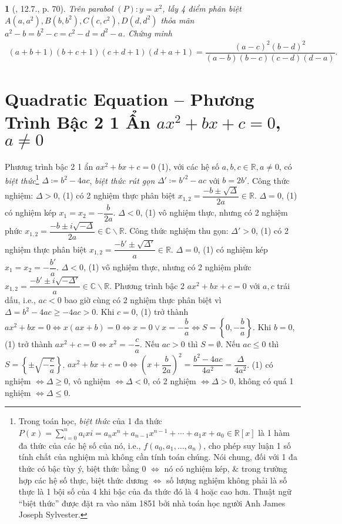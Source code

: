 \documentclass{article}
\newtheorem{baitoan}{}
\begin{document}
\begin{baitoan}[\cite{TLCT_THCS_Toan_9_dai_so}, 12.7., p. 70]
	Trên parabol $(P): y = x^2$, lấy 4 điểm phân biệt $A(a,a^2),B(b,b^2),C(c,c^2),D(d,d^2)$ thỏa mãn $a^2 - b = b^2 - c = c^2 - d = d^2 - a$. Chứng minh
	\begin{align*}
		(a + b + 1)(b + c + 1)(c + d + 1)(d + a + 1) = \dfrac{(a - c)^2(b - d)^2}{(a - b)(b - c)(c - d)(d - a)}.
	\end{align*}
\end{baitoan}


\section{Quadratic Equation -- Phương Trình Bậc 2 1 Ẩn $ax^2 + bx + c = 0$, $a\ne0$}
 Phương trình bậc 2 1 ẩn $ax^2 + bx + c = 0$ (1), với các hệ số $a,b,c\in\mathbb{R},a\ne0$, có \textit{biệt thức}\footnote{Trong toán học, \textit{biệt thức} của 1 đa thức $P(x) = \sum_{i=0}^n a_ixi = a_nx^n + a_{n-1}x^{n-1} + \cdots + a_1x + a_0\in\mathbb{R}[x]$ là 1 hàm đa thức của các hệ số của nó, i.e., $f(a_0,a_1,\ldots,a_n)$, cho phép suy luận 1 số tính chất của nghiệm mà không cần tính toán chúng. Nói chung, đối với 1 đa thức có bậc tùy ý, biệt thức bằng 0 $\Leftrightarrow$ nó có nghiệm kép, \& trong trường hợp các hệ số thực, biệt thức dương $\Leftrightarrow$ số lượng nghiệm không phải là số thực là 1 bội số của 4 khi bậc của đa thức đó là 4 hoặc cao hơn. Thuật ngữ ``biệt thức'' được đặt ra vào năm 1851 bởi nhà toán học người Anh James Joseph Sylvester.} $\Delta\coloneqq b^2 - 4ac$, \textit{biệt thức rút gọn} $\Delta'\coloneqq b'^2 - ac$ với $b = 2b'$.  Công thức nghiệm: $\Delta > 0$, (1) có 2 nghiệm thực phân biệt $x_{1,2} = \dfrac{-b\pm\sqrt{\Delta}}{2a}\in\mathbb{R}$. $\Delta = 0$, (1) có nghiệm kép $x_1 = x_2 = -\dfrac{b}{2a}$. $\Delta < 0$, (1) vô nghiệm thực, nhưng có 2 nghiệm phức $x_{1,2} = \dfrac{-b\pm i\sqrt{-\Delta}}{2a}\in\mathbb{C}\backslash\mathbb{R}$.  Công thức nghiệm thu gọn: $\Delta' > 0$, (1) có 2 nghiệm thực phân biệt $x_{1,2} = \dfrac{-b'\pm\sqrt{\Delta'}}{a}\in\mathbb{R}$. $\Delta = 0$, (1) có nghiệm kép $x_1 = x_2 = -\dfrac{b'}{a}$. $\Delta < 0$, (1) vô nghiệm thực, nhưng có 2 nghiệm phức $x_{1,2} = \dfrac{-b'\pm i\sqrt{-\Delta'}}{a}\in\mathbb{C}\backslash\mathbb{R}$.  Phương trình bậc 2 $ax^2 + bx + c = 0$ với $a,c$ trái dấu, i.e., $ac < 0$ bao giờ cùng có 2 nghiệm thực phân biệt vì $\Delta = b^2 - 4ac\ge-4ac > 0$.  Khi $c = 0$, (1) trở thành $ax^2 + bx = 0\Leftrightarrow x(ax + b) = 0\Leftrightarrow x = 0\lor x = -\dfrac{b}{a}\Leftrightarrow S = \left\{0,-\dfrac{b}{a}\right\}$.  Khi $b = 0$, (1) trở thành $ax^2 + c = 0\Leftrightarrow x^2 = -\dfrac{c}{a}$. Nếu $ac > 0$ thì $S = \emptyset$. Nếu $ac\le0$ thì $S = \left\{\pm\sqrt{-\dfrac{c}{a}}\right\}$.  $ax^2 + bx + c = 0\Leftrightarrow\left(x + \dfrac{b}{2a}\right)^2 = \dfrac{b^2 - 4ac}{4a^2} = \dfrac{\Delta}{4a^2}$.  (1) có nghiệm $\Leftrightarrow\Delta\ge0$, vô nghiệm $\Leftrightarrow\Delta < 0$, có 2 nghiệm $\Leftrightarrow\Delta > 0$, không có quá 1 nghiệm $\Leftrightarrow\Delta\le0$.
\end{document}
